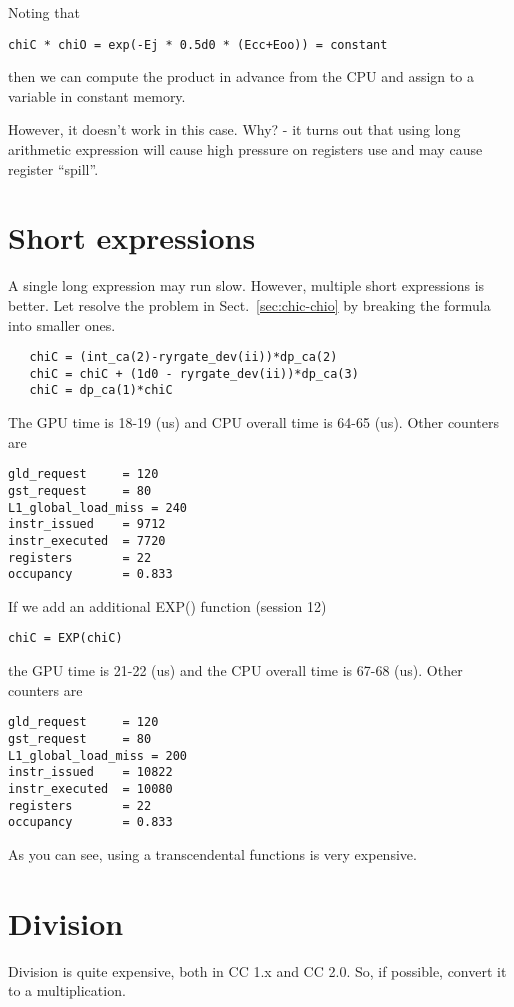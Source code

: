 Noting that 
\begin{verbatim}
chiC * chiO = exp(-Ej * 0.5d0 * (Ecc+Eoo)) = constant
\end{verbatim}
then we can compute the product in advance from the CPU and assign to
a variable in constant memory. 

However, it doesn't work in this case. Why? - it turns out that using
long arithmetic expression will cause high pressure on registers use
and may cause register ``spill''. 

\section{Short expressions}
\label{sec:short-expressions}

A single long expression may run slow. However, multiple short
expressions is better. Let resolve the problem in
Sect.~\ref{sec:chic-chio} by breaking the formula into smaller ones. 
\begin{verbatim}
   chiC = (int_ca(2)-ryrgate_dev(ii))*dp_ca(2)
   chiC = chiC + (1d0 - ryrgate_dev(ii))*dp_ca(3)
   chiC = dp_ca(1)*chiC
\end{verbatim}
The GPU time is 18-19 (us) and CPU overall time is 64-65 (us). Other
counters are
\begin{verbatim}
gld_request     = 120
gst_request     = 80 
L1_global_load_miss = 240
instr_issued    = 9712
instr_executed  = 7720
registers       = 22
occupancy       = 0.833
\end{verbatim}


If we add an additional EXP() function (session 12)
\begin{verbatim}
chiC = EXP(chiC)
\end{verbatim}
the GPU time is 21-22 (us) and the CPU overall time is 67-68
(us). Other counters are
\begin{verbatim}
gld_request     = 120
gst_request     = 80 
L1_global_load_miss = 200
instr_issued    = 10822
instr_executed  = 10080
registers       = 22
occupancy       = 0.833
\end{verbatim}
As you can see, using a transcendental functions is very expensive. 

\section{Division}
\label{sec:division}

Division is quite expensive, both in CC 1.x and CC 2.0. So, if
possible, convert it to a multiplication. 

